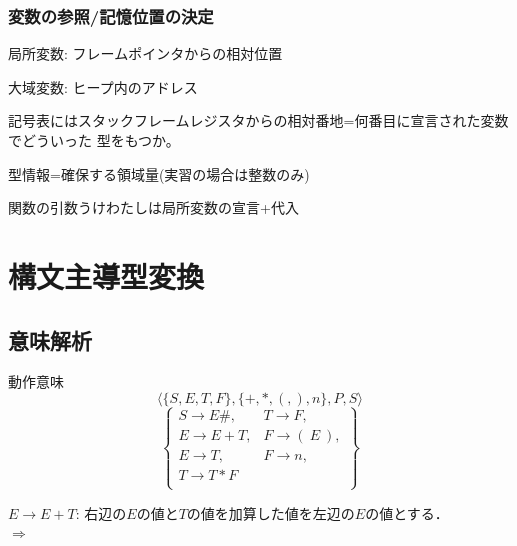 \documentclass[dvipdfmx]{beamer}
\begin{document}
\begin{frame}
  \frametitle{変数の参照/記憶位置の決定}

  \begin{list}{}{}
    \item 局所変数: フレームポインタからの相対位置
    \item 大域変数: ヒープ内のアドレス\\
  \end{list}


  記号表にはスタックフレームレジスタからの相対番地=何番目に宣言された変数でどういった
  型をもつか。

  型情報=確保する領域量(実習の場合は整数のみ)

  関数の引数うけわたしは局所変数の宣言+代入

\end{frame}

\section{構文主導型変換}

\subsection{意味解析}

\begin{frame}{動作意味}
  \[\langle\{S,E,T,F\},\{+,\ast,(,),n\},P,S
    \rangle\]
  \[\left\{\begin{array}{ll}
      S\rightarrow E\#,    & T\rightarrow F,       \\
      E\rightarrow E+T,    & F\rightarrow (\ E\ ), \\
      E\rightarrow T,      & F\rightarrow n,       \\
      T\rightarrow T\ast F &                       \\
    \end{array}\right\}\]

  \vspace*{3mm}


  \vspace*{3mm}

  $E\rightarrow E+T$: 右辺の$E$の値と$T$の値を加算した値を左辺の$E$の値とする．\\[3mm]
  $\Rightarrow$ 

\end{frame}
\end{document}
